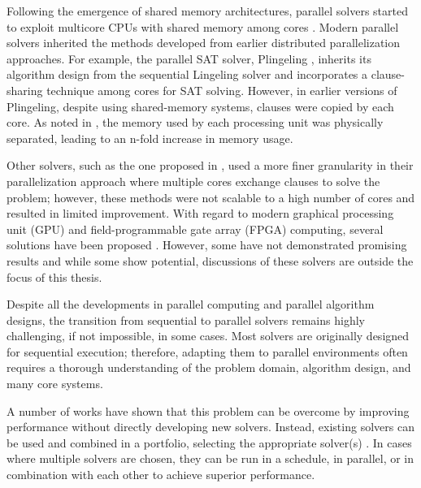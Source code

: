 Following the emergence of shared memory architectures, parallel solvers started to exploit multicore CPUs with shared memory among cores \cite{10.1007/11752578_46}. Modern parallel solvers inherited the methods developed from earlier distributed parallelization approaches. For example, the parallel SAT solver, Plingeling \cite{plingeling}, inherits its algorithm design from the sequential Lingeling solver and incorporates a clause-sharing technique among cores for SAT solving. However, in earlier versions of Plingeling, despite using shared-memory systems, clauses were copied by each core. As noted in \cite{Biere2013LingelingPA,conf/sat/AignerBKNP13}, the memory used by each processing unit was physically separated, leading to an n-fold increase in memory usage.

Other solvers, such as the one proposed in \cite{hyvarinen2012approaches,manthey2011parallel}, used a more finer granularity in their parallelization approach where multiple cores exchange clauses to solve the problem; however, these methods were not scalable to a high number of cores and resulted in limited improvement. With regard to modern graphical processing unit (GPU) and field-programmable gate array (FPGA) computing, several solutions have been proposed \cite{10.1007/3-540-44614-1_50,707896,4555925,10.1145/1497561.1497576,10.1007/s10703-023-00432-z,11390_1234673,5547116,10.1007/978-3-030-72016-2_8}. However, some have not demonstrated promising results and while some show potential, discussions of these solvers are outside the focus of this thesis. 

Despite all the developments in parallel computing and parallel algorithm designs, the transition from sequential to parallel solvers remains highly challenging, if not impossible, in some cases. Most solvers are originally designed for sequential execution; therefore, adapting them to parallel environments often requires a thorough understanding of the problem domain, algorithm design, and many core systems. 

A number of works have shown that this problem can be overcome by improving performance without directly developing new solvers. Instead, existing solvers can be used and combined in a portfolio, selecting the appropriate solver(s) \cite{Kotthoff2014,satzilla,kadiogluwin}. In cases where multiple solvers are chosen, they can be run in a schedule, in parallel, or in combination with each other to achieve superior performance.

